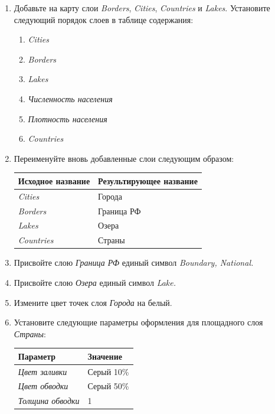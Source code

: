 \documentclass[]{book}
\providecommand{\tightlist}{%
  \setlength{\itemsep}{0pt}\setlength{\parskip}{0pt}}
\theoremstyle{definition}
\theoremstyle{definition}
\theoremstyle{definition}
\theoremstyle{remark}
\begin{document}
\begin{enumerate}
\def\labelenumi{\arabic{enumi}.}
\item
  Добавьте на карту слои \emph{Borders}, \emph{Cities}, \emph{Countries}
  и \emph{Lakes}. Установите следующий порядок слоев в таблице
  содержания:

  \begin{enumerate}
  \def\labelenumii{\alph{enumii}.}
  \tightlist
  \item
    \emph{Cities}
  \item
    \emph{Borders}
  \item
    \emph{Lakes}
  \item
    \emph{Численность населения}
  \item
    \emph{Плотность населения}
  \item
    \emph{Countries}
  \end{enumerate}
\item
  Переименуйте вновь добавленные слои следующим образом:

  \begin{longtable}[]{@{}ll@{}}
  \toprule
  \textbf{Исходное название} & \textbf{Результирующее
  название}\tabularnewline
  \midrule
  \endhead
  \emph{Cities} & Города\tabularnewline
  \emph{Borders} & Граница РФ\tabularnewline
  \emph{Lakes} & Озера\tabularnewline
  \emph{Countries} & Страны\tabularnewline
  \bottomrule
  \end{longtable}
\item
  Присвойте слою \emph{Граница РФ} единый символ \emph{Boundary,
  National.}
\item
  Присвойте слою \emph{Озера} единый символ \emph{Lake.}
\item
  Измените цвет точек слоя \emph{Города} на белый.
\item
  Установите следующие параметры оформления для площадного слоя
  \emph{Страны}:

  \begin{longtable}[]{@{}ll@{}}
  \toprule
  \textbf{Параметр} & \textbf{Значение}\tabularnewline
  \midrule
  \endhead
  \emph{Цвет заливки} & Серый 10\%\tabularnewline
  \emph{Цвет обводки} & Серый 50\%\tabularnewline
  \emph{Толщина обводки} & 1\tabularnewline
  \bottomrule
  \end{longtable}


\end{enumerate}
\end{document}

